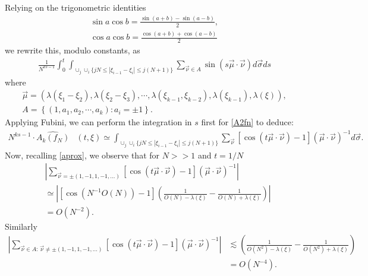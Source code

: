 \documentclass{amsart}
\begin{document}
Relying on the trigonometric identities
\begin{gather*}
\sin a\cos b= \frac{\sin(a + b) - \sin(a-b)}{2},
\\
\cos a \cos b = \frac{\cos(a + b) + \cos(a-b)}{2}
\end{gather*}
we rewrite this, modulo constants, as
\begin{gather*}
  \frac{1}{N^{ks-1}} \int_{0}^{t}
\int_{\cup_{j} \cup_{i}\{jN \leq |\xi_{i-1}-\xi_{i}|\leq j(N+1)\}}
\sum_{\vec{\nu} \in A}  \sin(s \vec{\mu} \cdot \vec{\nu}) d \vec{\sigma} ds
\end{gather*}
where
\begin{gather*}
  \vec{\mu} = \left ( \lambda(\xi_{1} - \xi_{2}), \lambda(\xi_{2} - \xi_{3}), \cdots, \lambda(\xi_{k-1}, \xi_{k-2}), \lambda(\xi_{k-1}), \lambda(\xi) \right ),
  \\
  A = \left \{ (1, a_{1}, a_{2}, \cdots, a_{k}): a_{i} = \pm 1 \right \}.
\end{gather*}
Applying Fubini, we can perform the integration in $s$ first for \eqref{A2fn} to deduce:
\begin{equation}
  \begin{split}
    N^{ks -1}\cdot \widehat{A_{k}(f_N)}&(t,\xi)
    \simeq
    \int_{\cup_{j} \cup_{i}\{jN \leq |\xi_{i-1}-\xi_{i}|\leq j(N+1)\}}
    \sum_{\vec{\nu}}  [\cos(t \vec{\mu} \cdot \vec{\nu}) -1] (\vec{\mu} \cdot \vec{\nu})^{-1}
    d \vec{\sigma}.
  \end{split}
\end{equation}
Now, recalling \eqref{aprox}, we observe that for $N >>1$ and $t = 1/N$
\begin{equation*}
\begin{split}
 & | \sum_{\vec{\nu} = \pm (1, -1, 1, -1, \dots)}  [\cos(t \vec{\mu} \cdot \vec{\nu})-1] (\vec{\mu} \cdot \vec{\nu})^{-1} |
\\
& \simeq 
\left | [\cos(N^{-1} O(N)) -1 ]
\left ( \frac{1}{O(N) - \lambda(\xi)} - \frac{1}{O(N)+ \lambda(\xi)} \right ) \right |
\\
& = O(N^{-2}).
\end{split}
\end{equation*}
Similarly
\begin{equation*}
\begin{split}
  | \sum_{\vec{\nu} \in A: \, \vec{\nu} \neq \pm (1, -1, 1, -1, \dots)}  [\cos(t \vec{\mu} \cdot \vec{\nu})-1] (\vec{\mu} \cdot \vec{\nu})^{-1} |
& \lesssim
\left ( \frac{1}{O(N^{2}) - \lambda(\xi)} - \frac{1}{O(N^{2})+ \lambda(\xi)} \right )
\\
& = O(N^{-4}).
\end{split}
\end{equation*}
\end{document}
